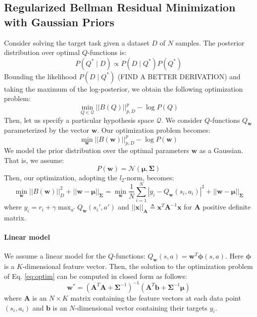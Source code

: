 \documentclass{article}
\begin{document}
\subsection{Regularized Bellman Residual Minimization with Gaussian Priors}

Consider solving the target task given a dataset $D$ of $N$ samples. The posterior distribution over optimal $Q$-functions is:
\begin{equation}
P(Q^* \mid D) \propto P(D \mid Q^*)P(Q^*)
\end{equation}
Bounding the likelihood $P(D \mid Q^*)$ ({\color{red}FIND A BETTER DERIVATION}) and taking the maximum of the log-posterior, we obtain the following optimization problem:
\begin{equation}
\min_{Q\in\mathcal{Q}} ||B(Q)||_{p,D}^p - \log P(Q) 
\end{equation}
Then, let us specify a particular hypothesis space $\mathcal{Q}$. We consider $Q$-functions $Q_{\bm{w}}$ parameterized by the vector $\bm{w}$. Our optimization problem becomes:
\begin{equation}
\min_{\bm{w}} ||B(\bm{w})||_{p,D}^p - \log P(\bm{w}) 
\end{equation}
We model the prior distribution over the optimal parameters $\bm{w}$ as a Gaussian. That is, we assume:
\begin{equation}
P(\bm{w}) = \mathcal{N}(\bm{\mu},\bm{\Sigma})
\end{equation}
Then, our optimization, adopting the $l_2$-norm, becomes:
\begin{equation} \label{eq:optim}
\min_{\bm{w}} ||B(\bm{w})||_{D}^2 + ||\bm{w}-\bm{\mu}||_{\bm{\Sigma}} = \min_{\bm{w}} \frac{1}{N}\sum_{i=1}^N\left\lvert y_i - Q_{\bm{w}}(s_i,a_i) \right\rvert^2 + ||\bm{w}-\bm{\mu}||_{\bm{\Sigma}}
\end{equation}
where $y_i = r_i + \gamma\max_{a'}Q_{\bm{w}}(s_i',a')$ and $||\bm{x}||_{\bm{A}} \triangleq \bm{x}^T\bm{A}^{-1}\bm{x}$ for $\bm{A}$ positive definite matrix.

\paragraph{Linear model}

We assume a linear model for the $Q$-functions: $Q_{\bm{w}}(s,a) = \bm{w}^T\bm{\phi}(s,a)$. Here $\bm{\phi}$ is a $K$-dimensional feature vector. Then, the solution to the optimization problem of Eq. \eqref{eq:optim} can be computed in closed form as follows:
\begin{equation}
\bm{w}^* = \left( \bm{A}^T\bm{A} + \bm{\Sigma}^{-1} \right)^{-1} \left( \bm{A}^T\bm{b} + \bm{\Sigma}^{-1}\bm{\mu} \right) 
\end{equation}
where $\bm{A}$ is an $N\times K$ matrix containing the feature vectors at each data point $(s_i,a_i)$ and $\bm{b}$ is an $N$-dimensional vector containing their targets $y_i$.
\end{document}
